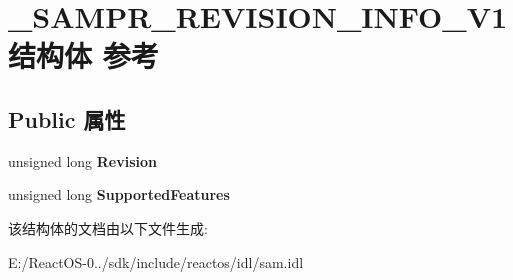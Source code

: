 \hypertarget{struct___s_a_m_p_r___r_e_v_i_s_i_o_n___i_n_f_o___v1}{}\section{\+\_\+\+S\+A\+M\+P\+R\+\_\+\+R\+E\+V\+I\+S\+I\+O\+N\+\_\+\+I\+N\+F\+O\+\_\+\+V1结构体 参考}
\label{struct___s_a_m_p_r___r_e_v_i_s_i_o_n___i_n_f_o___v1}
\subsection*{Public 属性}
\begin{DoxyCompactItemize}
\item 
\mbox{\label{struct___s_a_m_p_r___r_e_v_i_s_i_o_n___i_n_f_o___v1_ae334b52c19c475f5cde1fe5968d59f23}} 
unsigned long {\bfseries Revision}
\item 
\mbox{\label{struct___s_a_m_p_r___r_e_v_i_s_i_o_n___i_n_f_o___v1_a8e67e36ec7ea35eb46951f21adc2eb86}} 
unsigned long {\bfseries Supported\+Features}
\end{DoxyCompactItemize}


该结构体的文档由以下文件生成\+:\begin{DoxyCompactItemize}
\item 
E\+:/\+React\+O\+S-\/0../sdk/include/reactos/idl/sam.\+idl\end{DoxyCompactItemize}
